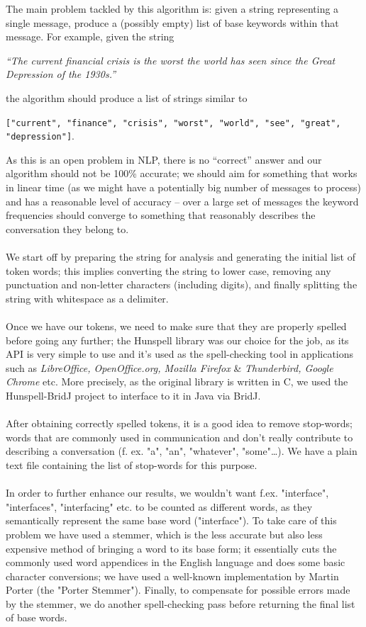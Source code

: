 \documentclass[12p, a4paper, onecolumn]{report}
\begin{document}
The main problem tackled by this algorithm is: given a string representing a single message, produce a (possibly empty) list of base keywords within that message. For example, given the string
\begin{center}
\textit{“The current financial crisis is the worst the world has seen since the Great Depression of the 1930s.”}
\end{center}
the algorithm should produce a list of strings similar to
\begin{center}
\texttt{["current", "finance", "crisis", "worst", "world", "see", "great", "depression"]}.
\end{center}
As this is an open problem in NLP, there is no “correct” answer and our algorithm should not be 100\% accurate; we should aim for something that works in linear time (as we might have a potentially big number of messages to process) and has a reasonable level of accuracy -- over a large set of messages the keyword frequencies should converge to something that reasonably describes the conversation they belong to.\\ \\
We start off by preparing the string for analysis and generating the initial list of token words; this implies converting the string to lower case, removing any punctuation and non-letter characters (including digits), and finally splitting the string with whitespace as a delimiter. \\ \\
Once we have our tokens, we need to make sure that they are properly spelled before going any further; the Hunspell library was our choice for the job, as its API is very simple to use and it's used as the spell-checking tool in applications such as \emph{LibreOffice, OpenOffice.org, Mozilla Firefox} \& \emph{Thunderbird, Google Chrome} etc. More precisely, as the original library is written in C, we used the Hunspell-BridJ project to interface to it in Java via BridJ.\\ \\
After obtaining correctly spelled tokens, it is a good idea to remove stop-words; words that are commonly used in communication and don't really contribute to describing a conversation (f. ex. "a", "an", "whatever", "some"\dots). We have a plain text file containing the list of stop-words for this purpose. \\ \\
In order to further enhance our results, we wouldn't want f.ex. "interface", "interfaces", "interfacing" etc. to be counted as different words, as they semantically represent the same base word ("interface"). To take care of this problem we have used a stemmer, which is the less accurate but also less expensive method of bringing a word to its base form; it essentially cuts the commonly used word appendices in the English language and does some basic character conversions; we have used a well-known implementation by Martin Porter (the "Porter Stemmer"). Finally, to compensate for possible errors made by the stemmer, we do another spell-checking pass before returning the final list of base words.\\ \\
\end{document}
